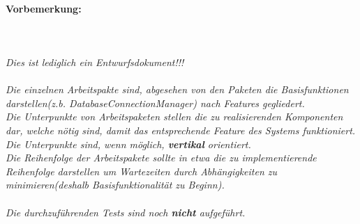 \documentclass[12pt,a4paper]{scrreprt}
\begin{document}
	\paragraph{Vorbemerkung:}\ \\
	 \ \\
	{\it Dies ist lediglich ein Entwurfsdokument!!! \\ \\
		Die einzelnen Arbeitspakte sind, abgesehen von den Paketen die Basisfunktionen darstellen(z.b. DatabaseConnectionManager) nach Features gegliedert.\\
		Die Unterpunkte von Arbeitspaketen stellen die zu realisierenden Komponenten dar, welche nötig sind, damit das entsprechende Feature des Systems funktioniert. Die Unterpunkte sind, wenn möglich, \textbf{vertikal} orientiert.\ \\
		Die Reihenfolge der Arbeitspakete sollte in etwa die zu implementierende Reihenfolge darstellen um  Wartezeiten durch Abhängigkeiten zu minimieren(deshalb Basisfunktionalität zu Beginn).\ \\
		\ \\
		Die durchzuführenden Tests sind noch \textbf{nicht} aufgeführt. 
		 }
	
\end{document}

